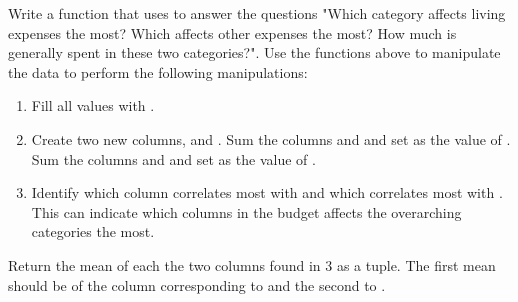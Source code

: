 \begin{problem}
Write a function  that uses  to answer the questions "Which category affects living expenses the most? Which affects other expenses the most? How much is generally spent in these two categories?".
Use the functions above to manipulate the data to perform the following manipulations:
\begin{enumerate}
\item Fill all  values with .
\item Create two new columns,  and . 
Sum the columns  and  and set as the value of .
Sum the columns  and  and set as the value of .
\item  Identify which column correlates most with  and which correlates most with .
This can indicate which columns in the budget affects the overarching categories the most.
\end{enumerate}
Return the mean of each the two columns found in 3 as a tuple.
The first mean should be of the column corresponding to  and the second to .
\end{problem}

\begin{comment}
\begin{problem}
Read in the file \li{crime_data.csv} as a pandas object.
The file contains data on types of crimes in the U.S. from 1960 to 2016.
Set the index as the column 'Year'.

Create a new column \li{Rate} which contains the crime rate for each year.
Use this table to answer the following questions:
\begin{enumerate}
    \item What is the mean crime rate? In what years was the crime rate above the mean?
    \item On average, using the mean, what is the least common crime?
    \item Identify two crimes which have close means. Do these crimes have any kind of correlation from year to year? If so, what is the correlation?
       
\end{enumerate}
\end{problem}
\end{comment}


